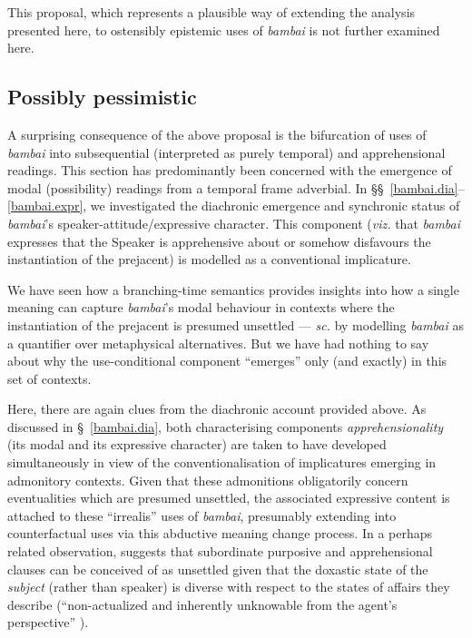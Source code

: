 This proposal, which represents a plausible way of extending the analysis presented here, to ostensibly epistemic uses of \textit{bambai} is not further examined here.



\subsection{Possibly pessimistic}

A surprising consequence of the above proposal is the bifurcation of uses of \textit{bambai} into subsequential (interpreted as purely temporal) and apprehensional readings. This section has predominantly been concerned with the emergence of modal (possibility) readings from a temporal frame adverbial. In \S\S~\ref{bambai.dia}--\ref{bambai.expr}, we investigated the diachronic emergence and synchronic status of \textit{bambai}'s speaker-attitude/expressive character. This component (\textit{viz.} that \textit{bambai} expresses that the Speaker is apprehensive about or somehow disfavours the instantiation of the prejacent) is modelled as a conventional implicature.

We have seen how a branching-time semantics provides insights into how a single meaning can capture \textit{bambai}'s modal behaviour in contexts where the instantiation of the prejacent is presumed unsettled --- \textit{sc.} by modelling \textit{bambai} as a quantifier over metaphysical alternatives. But we have had nothing to say about why the use-conditional component ``emerges'' only (and exactly) in this set of contexts.

Here, there are again clues from the diachronic account provided above. As discussed in \S~\ref{bambai.dia}, both characterising components \textit{apprehensionality} (its modal and its expressive character) are taken to have developed simultaneously in view of the conventionalisation of implicatures emerging in admonitory contexts. Given that these admonitions obligatorily concern eventualities which are presumed unsettled, the associated expressive content is attached to these ``irrealis'' uses of \textit{bambai}, presumably extending into counterfactual uses via this abductive meaning change process. In a perhaps related observation, \citeauthor{Verstraete2006} suggests that subordinate purposive and apprehensional clauses can be conceived of as unsettled given that the doxastic state of the \textit{subject} (rather than speaker) is diverse with respect to the states of affairs they describe (``non-actualized and inherently unknowable from the agent's perspective'' \citeyear[71]{Verstraete2006}).


